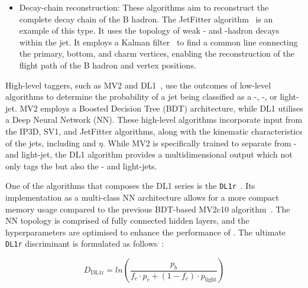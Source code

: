 \begin{itemize}
	\item Decay-chain reconstruction: These algorithms aim to reconstruct the 
	complete decay chain of the B hadron. The JetFitter algorithm~\cite{ATLAS:2018nnq} is an example
	of this type. It uses the topology of weak \Pbottom- and \Pcharm-hadron decays 
	within the jet. It employs a Kalman filter~\cite{Fruhwirth:1987fm} to find a common line 
	connecting the primary, bottom, and charm vertices, enabling the reconstruction of 
	the  flight path of the B hadron and vertex positions.
\end{itemize}

High-level taggers, such as MV2 and DL1~\cite{ATLAS:2017bcq, ATLAS:2017gpy}, use the outcomes 
of low-level algorithms to determine the probability of a jet being classified as a 
\Pbottom-, \Pcharm-, or light-jet. MV2 employs a Boosted Decision Tree (BDT) architecture, while DL1 utilises 
a Deep Neural Network (NN). These high-level algorithms incorporate input from the IP3D, 
SV1, and JetFitter algorithms, along with the kinematic characteristics of the jets, 
including \pT and $\eta$. While MV2 is specifically trained to separate \bjets from
\Pcharm- and light-jet, the DL1 algorithm  provides a multidimensional output which
not only tags the \bjets but also the \Pcharm- and light-jets. 

One of the algorithms that composes the DL1 series is the \texttt{DL1r}~\cite{ATLAS:2017gpy}.
Its implementation as a multi-class NN architecture allows for a more compact 
memory usage compared to the previous BDT-based MV2c10 
algorithm~\cite{ATLAS:2019bwq}. The NN topology is comprised of fully connected 
hidden layers, and the hyperparameters are optimised to enhance the performance 
of \btag. The ultimate \texttt{DL1r} \btag discriminant is formulated as follows~\cite{ATL-PHYS-PUB-2017-013}:

\begin{equation}
\label{eq:Chap3:DL1r_discriminant}
	D_{\text{DL1r}}=ln \left(\frac{p_{b}}{f_{c} \cdot p_{c}+( 1 - f_{c})\cdot p_{ \text{light} }} \right)
\end{equation}

